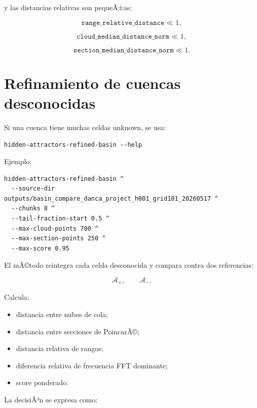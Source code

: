 \documentclass[11pt]{article}
\DeclareRobustCommand{\codepath}[1]{\begingroup\Urlmuskip=0mu plus 2mu\path{#1}\endgroup}
\def\codepath#1{#1}%
\begin{document}
y las distancias relativas son pequeÃ±as:

\begin{equation}
\texttt{range\_relative\_distance}\ll 1,
\end{equation}

\begin{equation}
\texttt{cloud\_median\_distance\_norm}\ll 1,
\end{equation}

\begin{equation}
\texttt{section\_median\_distance\_norm}\ll 1.
\end{equation}

\section{Refinamiento de cuencas desconocidas}

Si una cuenca tiene muchas celdas \codepath{unknown}, se usa:

\begin{lstlisting}
hidden-attractors-refined-basin --help
\end{lstlisting}

Ejemplo:

\begin{lstlisting}
hidden-attractors-refined-basin ^
  --source-dir outputs/basin_compare_danca_project_h001_grid101_20260517 ^
  --chunks 8 ^
  --tail-fraction-start 0.5 ^
  --max-cloud-points 700 ^
  --max-section-points 250 ^
  --max-score 0.95
\end{lstlisting}

El mÃ©todo reintegra cada celda desconocida y compara contra dos referencias:

\begin{equation}
\mathcal A_+,\qquad \mathcal A_-.
\end{equation}

Calcula:

\begin{itemize}
\item distancia entre nubes de cola;
\item distancia entre secciones de PoincarÃ©;
\item distancia relativa de rangos;
\item diferencia relativa de frecuencia FFT dominante;
\item score ponderado.
\end{itemize}

La decisiÃ³n se expresa como:
\end{document}
